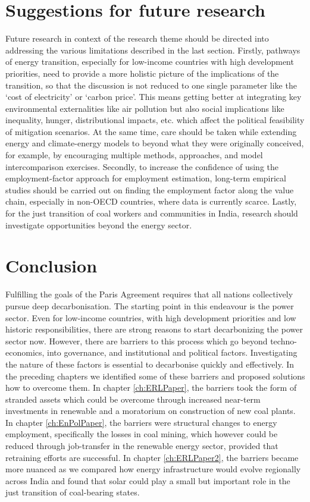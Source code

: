 \documentclass[../thesis.tex]{subfiles}
\begin{document}
\section{Suggestions for future research}
Future research in context of the research theme should be directed into addressing the various limitations described in the last section. Firstly, pathways of energy transition, especially for low-income countries with high development priorities, need to provide a more holistic picture of the implications of the transition, so that the discussion is not reduced to one single parameter like the `cost of electricity' or `carbon price'. This means getting better at integrating key environmental externalities like air pollution but also social implications like inequality, hunger, distributional impacts, etc. which affect the political feasibility of mitigation scenarios. At the same time, care should be taken while extending energy and climate-energy models to beyond what they were originally conceived, for example, by encouraging multiple methods, approaches, and model intercomparison  exercises. Secondly, to increase the confidence of using the employment-factor approach for employment estimation, long-term empirical studies should be carried out on finding the employment factor along the value chain, especially in non-OECD countries, where data is currently scarce. Lastly, for the just transition of coal workers and communities in India, research should investigate opportunities beyond the energy sector.   

\section{Conclusion}
Fulfilling the goals of the Paris Agreement requires that all nations collectively pursue deep decarbonisation. The starting point in this endeavour is the power sector. Even for low-income countries, with high development priorities and low historic responsibilities, there are strong reasons to start decarbonizing the power sector now. However, there are barriers to this process which go beyond techno-economics, into governance, and institutional and political factors. Investigating the nature of these factors is essential to decarbonise quickly and effectively. In the preceding chapters we identified some of these barriers and proposed solutions how to overcome them. In chapter \ref{ch:ERLPaper}, the barriers took the form of stranded assets which could be overcome through increased near-term investments in renewable and a moratorium on construction of new coal plants. In chapter \ref{ch:EnPolPaper}, the barriers were structural changes to energy employment, specifically the losses in coal mining, which however could be reduced through job-transfer in the renewable energy sector, provided that retraining efforts are successful. In chapter \ref{ch:ERLPaper2}, the barriers became more nuanced as we compared how energy infrastructure would evolve regionally across India and found that solar could play a small but important role in the just transition of coal-bearing states.




\biblio
\end{document}
